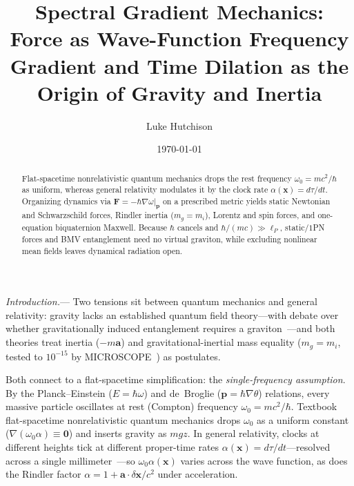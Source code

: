 \documentclass[aps,prl,reprint,superscriptaddress,nofootinbib,floatfix]{revtex4-2}
\theoremstyle{prlthm}
\newcommand{\prlsec}[1]{\par\smallskip\noindent\emph{#1.}---}
\begin{document}
\title{Spectral Gradient Mechanics: Force as Wave-Function Frequency Gradient and Time Dilation as the Origin of Gravity and Inertia}
\newif\ifanonymous \anonymousfalse %
\newcommand{\companionauthor}{\ifanonymous Anonymous\else L.~Hutchison\fi}
\ifanonymous\else\author{Luke Hutchison}
\noaffiliation\fi
\date{\today}

\begin{abstract}
Flat-spacetime nonrelativistic quantum mechanics drops the rest frequency $\omega_0=mc^2/\hbar$ as uniform, whereas general relativity modulates it by the clock rate $\alpha(\mathbf{x})=d\tau/dt$. Organizing dynamics via $\mathbf{F}=-\hbar\nabla\omega|_{\mathbf{p}}$ on a prescribed metric yields static Newtonian and Schwarzschild forces, Rindler inertia ($m_g=m_i$), Lorentz and spin forces, and one-equation biquaternion Maxwell. Because $\hbar$ cancels and $\hbar/(mc)\gg\ell_P$, static/$1$PN forces and BMV entanglement need no virtual graviton, while excluding nonlinear mean fields leaves dynamical radiation open.
\end{abstract}

\maketitle

\prlsec{Introduction}
Two tensions sit between quantum mechanics and general relativity: gravity lacks an established quantum field theory---with debate over whether gravitationally induced entanglement requires a graviton~\citep{DeWitt1967Quantum,Bose2017Spin,Marletto2017Gravitationally,Anastopoulos2018Comment}---and both theories treat inertia ($-m\mathbf{a}$) and gravitational-inertial mass equality ($m_g=m_i$, tested to $10^{-15}$ by MICROSCOPE~\citep{Touboul2022Final}) as postulates.

Both connect to a flat-spacetime simplification: the \emph{single-frequency assumption}. By the Planck--Einstein ($E=\hbar\omega$) and de~Broglie ($\mathbf{p}=\hbar\nabla\theta$) relations, every massive particle oscillates at rest (Compton) frequency $\omega_0=mc^2/\hbar$. Textbook flat-spacetime nonrelativistic quantum mechanics drops $\omega_0$ as a uniform constant ($\nabla(\omega_0\alpha)\equiv\mathbf{0}$) and inserts gravity as $mgz$. In general relativity, clocks at different heights tick at different proper-time rates $\alpha(\mathbf{x})=d\tau/dt$---resolved across a single millimeter~\citep{Bothwell2022Resolving}---so $\omega_0\alpha(\mathbf{x})$ varies across the wave function, as does the Rindler factor $\alpha=1+\mathbf{a}\cdot\delta\mathbf{x}/c^2$ under acceleration.
\end{document}
